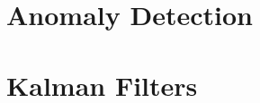 \section{Anomaly Detection}
\label{time_series:anomaly_detection}


\section{Kalman Filters}
\label{time_series:kalman_filters}
